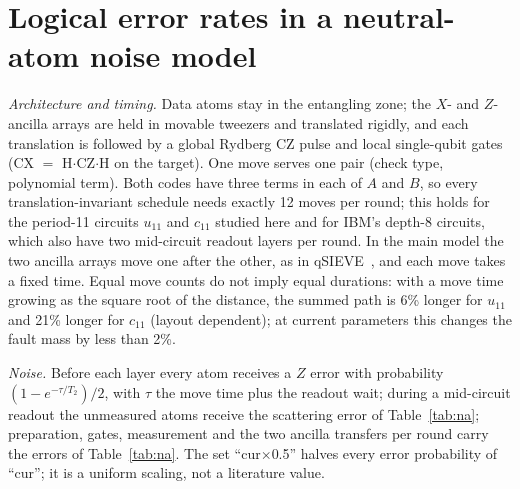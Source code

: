 \documentclass[aps,prl,twocolumn,superscriptaddress,nofootinbib]{revtex4-2}
\begin{document}
\section{Logical error rates in a neutral-atom noise model}\label{sm:na}
\emph{Architecture and timing.} Data atoms stay in the entangling zone; the $X$- and
$Z$-ancilla arrays are held in movable tweezers and translated rigidly, and each translation
is followed by a global Rydberg CZ pulse and local single-qubit gates (CX $=$
H$\cdot$CZ$\cdot$H on the target). One move serves one pair (check type, polynomial term).
Both codes have three terms in each of $A$ and $B$, so every translation-invariant schedule
needs exactly 12 moves per round; this holds for the period-11 circuits $u_{11}$ and
$c_{11}$ studied here and for IBM's depth-8 circuits, which also have two mid-circuit
readout layers per round. In the main model the two ancilla arrays move one after the
other, as in qSIEVE~\cite{Viszlai2026}, and each move takes a fixed time. Equal move counts
do not imply equal durations: with a move time growing as the square root of the distance,
the summed path is 6\% longer for $u_{11}$ and 21\% longer for $c_{11}$ (layout dependent);
at current parameters this changes the fault mass by less than 2\%.

\emph{Noise.} Before each layer every atom receives a $Z$ error with probability
$(1-e^{-\tau/T_2})/2$, with $\tau$ the move time plus the readout wait; during a mid-circuit
readout the unmeasured atoms receive the scattering error of Table~\ref{tab:na};
preparation, gates, measurement and the two ancilla transfers per round carry the errors of
Table~\ref{tab:na}. The set ``cur$\times$0.5'' halves every error probability of ``cur''; it
is a uniform scaling, not a literature value.
\end{document}

